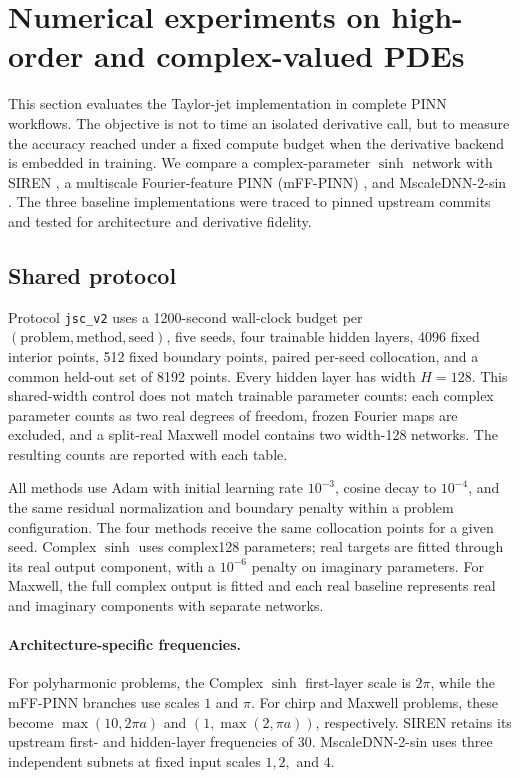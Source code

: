 
\section{Numerical experiments on high-order and complex-valued PDEs}
\label{sec:osc}

This section evaluates the Taylor-jet implementation in complete PINN
workflows. The objective is not to time an isolated derivative call, but to
measure the accuracy reached under a fixed compute budget when the derivative
backend is embedded in training. We compare a complex-parameter \(\sinh\)
network with SIREN \cite{Sitzmann2020SIREN}, a multiscale Fourier-feature PINN
(mFF-PINN) \cite{Tancik2020Fourier,Wang2021Pathologies}, and MscaleDNN-2-sin
\cite{Liu2020MscaleDNN}. The three baseline implementations were traced to
pinned upstream commits and tested for architecture and derivative fidelity.

\subsection{Shared protocol}
\label{sec:bm:protocol}

Protocol \texttt{jsc\_v2} uses a 1200-second wall-clock budget per
\((\text{problem},\text{method},\text{seed})\), five seeds, four trainable
hidden layers, 4096 fixed interior points, 512 fixed boundary points, paired
per-seed collocation, and a common held-out set of 8192 points. Every hidden
layer has width \(H=128\). This shared-width control does not match trainable
parameter counts:
each complex parameter counts as two real degrees of freedom, frozen Fourier
maps are excluded, and a split-real Maxwell model contains two width-128
networks. The resulting counts are reported with each table.

All methods use Adam with initial learning rate \(10^{-3}\), cosine decay to
\(10^{-4}\), and the same residual normalization and boundary penalty within
a problem configuration. The four methods receive the same collocation points
for a given seed. Complex \(\sinh\) uses complex128 parameters; real targets are
fitted through its real output component, with a \(10^{-6}\) penalty on
imaginary parameters. For Maxwell, the full complex output is fitted and each
real baseline represents real and imaginary components with separate
networks.

\paragraph{Architecture-specific frequencies.}
For polyharmonic problems, the Complex \(\sinh\) first-layer scale is
\(2\pi\), while the mFF-PINN branches use scales \(1\) and \(\pi\). For chirp
and Maxwell problems, these become
\(\max(10,2\pi a)\) and \((1,\max(2,\pi a))\), respectively. SIREN retains
its upstream first- and hidden-layer frequencies of 30. MscaleDNN-2-sin uses
three independent subnets at fixed input scales \(1,2,\) and \(4\).


